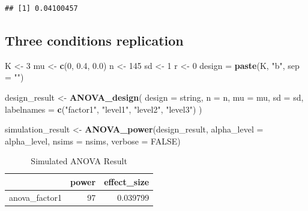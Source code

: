 \documentclass[]{book}
\newenvironment{Shaded}{\begin{snugshade}}{\end{snugshade}}
\newcommand{\DataTypeTok}[1]{\textcolor[rgb]{0.13,0.29,0.53}{#1}}
\newcommand{\DecValTok}[1]{\textcolor[rgb]{0.00,0.00,0.81}{#1}}
\newcommand{\FloatTok}[1]{\textcolor[rgb]{0.00,0.00,0.81}{#1}}
\newcommand{\KeywordTok}[1]{\textcolor[rgb]{0.13,0.29,0.53}{\textbf{#1}}}
\newcommand{\NormalTok}[1]{#1}
\newcommand{\OtherTok}[1]{\textcolor[rgb]{0.56,0.35,0.01}{#1}}
\newcommand{\StringTok}[1]{\textcolor[rgb]{0.31,0.60,0.02}{#1}}
\begin{document}
\begin{verbatim}
## [1] 0.04100457
\end{verbatim}

\hypertarget{three-conditions-replication-1}{%
\subsection{Three conditions replication}\label{three-conditions-replication-1}}

\begin{Shaded}
\begin{Highlighting}[]
\NormalTok{K <-}\StringTok{ }\DecValTok{3}
\NormalTok{mu <-}\StringTok{ }\KeywordTok{c}\NormalTok{(}\DecValTok{0}\NormalTok{, }\FloatTok{0.4}\NormalTok{, }\FloatTok{0.0}\NormalTok{)}
\NormalTok{n <-}\StringTok{ }\DecValTok{145}
\NormalTok{sd <-}\StringTok{ }\DecValTok{1}
\NormalTok{r <-}\StringTok{ }\DecValTok{0}
\NormalTok{design =}\StringTok{ }\KeywordTok{paste}\NormalTok{(K, }\StringTok{"b"}\NormalTok{, }\DataTypeTok{sep =} \StringTok{""}\NormalTok{)}
\end{Highlighting}
\end{Shaded}

\begin{Shaded}
\begin{Highlighting}[]
\NormalTok{design_result <-}\StringTok{ }\KeywordTok{ANOVA_design}\NormalTok{(}
  \DataTypeTok{design =}\NormalTok{ string,}
  \DataTypeTok{n =}\NormalTok{ n,}
  \DataTypeTok{mu =}\NormalTok{ mu,}
  \DataTypeTok{sd =}\NormalTok{ sd,}
  \DataTypeTok{labelnames =} \KeywordTok{c}\NormalTok{(}\StringTok{"factor1"}\NormalTok{, }\StringTok{"level1"}\NormalTok{, }\StringTok{"level2"}\NormalTok{, }\StringTok{"level3"}\NormalTok{)}
\NormalTok{  )}

\NormalTok{simulation_result <-}\StringTok{ }\KeywordTok{ANOVA_power}\NormalTok{(design_result, }
                                 \DataTypeTok{alpha_level =}\NormalTok{ alpha_level, }
                                 \DataTypeTok{nsims =}\NormalTok{ nsims,}
                                 \DataTypeTok{verbose =} \OtherTok{FALSE}\NormalTok{)}
\end{Highlighting}
\end{Shaded}

\begin{table}[t]

\caption{\label{tab:unnamed-chunk-49}Simulated ANOVA Result}
\centering
\begin{tabular}{l|r|r}
\hline
  & power & effect\_size\\
\hline
anova\_factor1 & 97 & 0.039799\\
\hline
\end{tabular}
\end{table}
\end{document}
